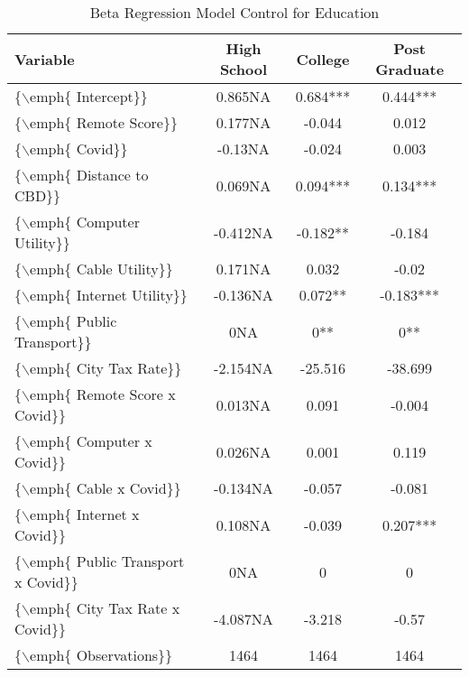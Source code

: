 \begin{table}[ht]
\centering
\begin{tabular}{|l|c|c|c|}
  \hline
Variable & High School & College & Post Graduate \\ 
  \hline
\{$\backslash$emph\{ Intercept\}\} & 0.865NA & 0.684*** & 0.444*** \\ 
  \{$\backslash$emph\{ Remote Score\}\} & 0.177NA & -0.044 & 0.012 \\ 
  \{$\backslash$emph\{ Covid\}\} & -0.13NA & -0.024 & 0.003 \\ 
  \{$\backslash$emph\{ Distance to CBD\}\} & 0.069NA & 0.094*** & 0.134*** \\ 
  \{$\backslash$emph\{ Computer Utility\}\} & -0.412NA & -0.182** & -0.184 \\ 
  \{$\backslash$emph\{ Cable Utility\}\} & 0.171NA & 0.032 & -0.02 \\ 
  \{$\backslash$emph\{ Internet Utility\}\} & -0.136NA & 0.072** & -0.183*** \\ 
  \{$\backslash$emph\{ Public Transport\}\} & 0NA & 0** & 0** \\ 
  \{$\backslash$emph\{ City Tax Rate\}\} & -2.154NA & -25.516 & -38.699 \\ 
  \{$\backslash$emph\{ Remote Score x Covid\}\} & 0.013NA & 0.091 & -0.004 \\ 
  \{$\backslash$emph\{ Computer x Covid\}\} & 0.026NA & 0.001 & 0.119 \\ 
  \{$\backslash$emph\{ Cable x Covid\}\} & -0.134NA & -0.057 & -0.081 \\ 
  \{$\backslash$emph\{ Internet x Covid\}\} & 0.108NA & -0.039 & 0.207*** \\ 
  \{$\backslash$emph\{ Public Transport x Covid\}\} & 0NA & 0 & 0 \\ 
  \{$\backslash$emph\{ City Tax Rate x Covid\}\} & -4.087NA & -3.218 & -0.57 \\ 
  \{$\backslash$emph\{ Observations\}\} & 1464 & 1464 & 1464 \\ 
   \hline
\end{tabular}
\caption{Beta Regression Model Control for Education} 
\end{table}
